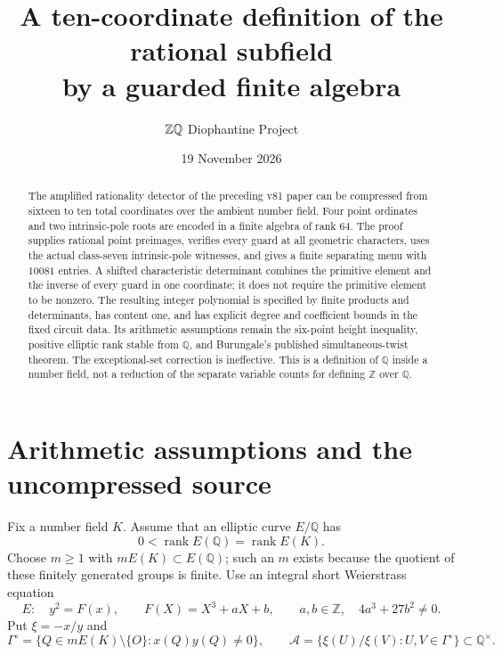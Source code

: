 \documentclass[11pt,a4paper]{article}
\title{A ten-coordinate definition of the rational subfield\\
by a guarded finite algebra}
\author{\(\Z\Q\) Diophantine Project}
\date{19 November 2026}
\newcommand{\Q}{\mathbb Q}\newcommand{\Z}{\mathbb Z}
\DeclareMathOperator{\rank}{rank}
\begin{document}
\maketitle
\begin{abstract}
The amplified rationality detector of the preceding v81 paper can be
compressed from sixteen to ten total coordinates over the ambient
number field. Four point ordinates and two intrinsic-pole roots are
encoded in a finite algebra of rank \(64\). The proof supplies rational
point preimages, verifies every guard at all geometric characters,
uses the actual class-seven intrinsic-pole witnesses, and gives a
finite separating menu with \(10081\) entries. A shifted characteristic
determinant combines the primitive element and the inverse of every
guard in one coordinate; it does not require the primitive element
to be nonzero. The resulting integer polynomial is specified by finite
products and determinants, has content one, and has explicit degree
and coefficient bounds in the fixed circuit data. Its arithmetic
assumptions remain the six-point height inequality, positive elliptic
rank stable from \(\Q\), and Burungale's published simultaneous-twist
theorem. The exceptional-set correction is ineffective. This is a
definition of \(\Q\) inside a number field, not a reduction of the
separate variable counts for defining \(\Z\) over \(\Q\).
\end{abstract}

\section{Arithmetic assumptions and the uncompressed source}

Fix a number field \(K\). Assume that an elliptic curve \(E/\Q\) has
\[
 0<\rank E(\Q)=\rank E(K).
\]
Choose \(m\ge1\) with \(mE(K)\subset E(\Q)\); such an \(m\) exists
because the quotient of these finitely generated groups is finite.
Use an integral short Weierstrass equation
\begin{equation}\label{eq:curve}
 E:\quad y^2=F(x),\qquad F(X)=X^3+aX+b,\qquad
 a,b\in\Z,\quad 4a^3+27b^2\ne0.
\end{equation}
Put \(\xi=-x/y\) and
\[
 \Gamma^\circ=\{Q\in mE(K)\setminus\{O\}:x(Q)y(Q)\ne0\},\qquad
 \mathcal A=\{\xi(U)/\xi(V):U,V\in\Gamma^\circ\}\subset\Q^\times.
\]
\end{document}
